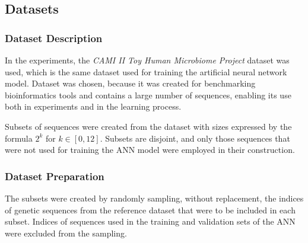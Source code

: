 \documentclass[pdflatex,sn-vancouver-num]{sn-jnl}%
\begin{document}


        \subsection{Datasets}
            \subsubsection{Dataset Description}
                In the experiments, the \textit{CAMI II Toy Human Microbiome Project}\cite{Fritz:2019} dataset was used, which is the same dataset used for training the artificial neural network model. Dataset was chosen, because it was created for benchmarking bioinformatics tools and contains a large number of sequences, enabling its use both in experiments and in the learning process.

                Subsets of sequences were created from the dataset with sizes expressed by the formula $2^k$ for $k \in [0, 12]$. Subsets are disjoint, and only those sequences that were not used for training the ANN model were employed in their construction.

            \subsubsection{Dataset Preparation}
                The subsets were created by randomly sampling, without replacement, the indices of genetic sequences from the reference dataset that were to be included in each subset. Indices of sequences used in the training and validation sets of the ANN were excluded from the sampling. 
\end{document}
